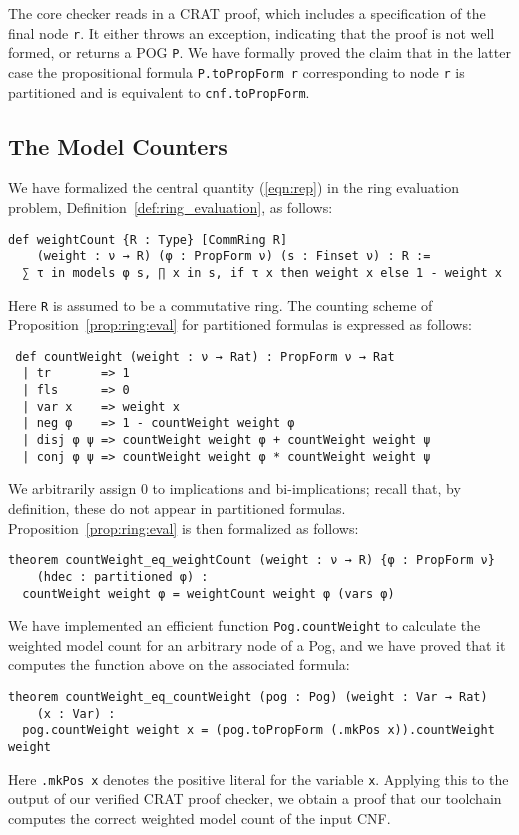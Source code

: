 The core checker reads in a CRAT proof, which includes a specification of the final node \lstinline{r}.
It either throws an exception, indicating that the proof is not well formed,
or returns a POG \lstinline{P}.
We have formally proved the claim that in the latter case the propositional formula \lstinline{P.toPropForm r} corresponding to node \lstinline{r} is partitioned
and is equivalent to \lstinline{cnf.toPropForm}.

\subsection{The Model Counters}

We have formalized the central quantity (\ref{eqn:rep}) in the ring evaluation problem,
Definition~\ref{def:ring_evaluation}, as follows:
\begin{lstlisting}
def weightCount {R : Type} [CommRing R]
    (weight : ν → R) (φ : PropForm ν) (s : Finset ν) : R :=
  ∑ τ in models φ s, ∏ x in s, if τ x then weight x else 1 - weight x
\end{lstlisting}
Here \lstinline{R} is assumed to be a commutative ring.
The counting scheme of Proposition~\ref{prop:ring:eval} for partitioned formulas is expressed as follows:
\begin{lstlisting}
 def countWeight (weight : ν → Rat) : PropForm ν → Rat
  | tr       => 1
  | fls      => 0
  | var x    => weight x
  | neg φ    => 1 - countWeight weight φ
  | disj φ ψ => countWeight weight φ + countWeight weight ψ
  | conj φ ψ => countWeight weight φ * countWeight weight ψ
\end{lstlisting}
We arbitrarily assign 0 to implications and bi-implications;
recall that, by definition, these do not appear in partitioned formulas.
Proposition~\ref{prop:ring:eval} is then formalized as follows:
\begin{lstlisting}
theorem countWeight_eq_weightCount (weight : ν → R) {φ : PropForm ν}
    (hdec : partitioned φ) :
  countWeight weight φ = weightCount weight φ (vars φ)
\end{lstlisting}

We have implemented an efficient function \lstinline{Pog.countWeight} to calculate the weighted model count
for an arbitrary node of a Pog, and we have proved that it computes the function above on the
associated formula:
\begin{lstlisting}
theorem countWeight_eq_countWeight (pog : Pog) (weight : Var → Rat)
    (x : Var) :
  pog.countWeight weight x = (pog.toPropForm (.mkPos x)).countWeight weight
\end{lstlisting}
Here \lstinline{.mkPos x} denotes the positive literal for the variable \lstinline{x}.
Applying this to the output of our verified CRAT proof checker,
we obtain a proof that
our toolchain computes the correct weighted model count of the input CNF.

